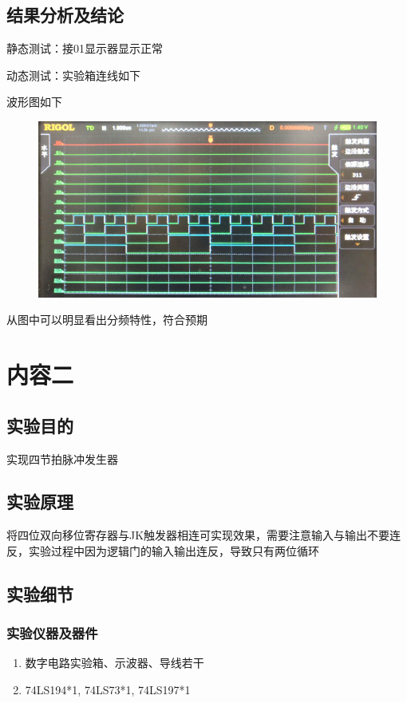 \documentclass[11pt,UTF8]{ctexart}
\begin{document}
\subsection{结果分析及结论}
\par 静态测试：接01显示器显示正常
\par 动态测试：实验箱连线如下

\par 波形图如下
\begin{figure}[H]
    \centering
    \includegraphics[width=0.9\linewidth]{fig/wave1.PNG}
\end{figure}

\par 从图中可以明显看出分频特性，符合预期


\section{内容二}
\subsection{实验目的}
实现四节拍脉冲发生器

\subsection{实验原理}
将四位双向移位寄存器与JK触发器相连可实现效果，需要注意输入与输出不要连反，实验过程中因为逻辑门的输入输出连反，导致只有两位循环

\subsection{实验细节}
\subsubsection{实验仪器及器件}
\begin{enumerate}
    \item 数字电路实验箱、示波器、导线若干
    \item 74LS194*1, 74LS73*1, 74LS197*1
\end{enumerate}
\end{document}
